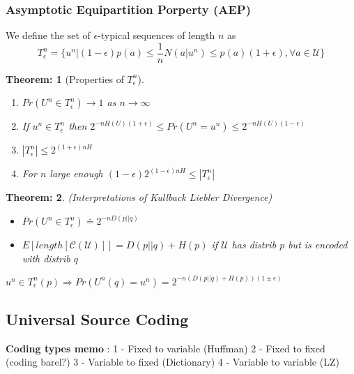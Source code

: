 \documentclass[11pt, a4paper]{scrartcl}
\newtheorem{theorem}{Theorem:}[section]
\newenvironment{definition}[1][Definition]{\begin{trivlist}
\item[\hskip \labelsep {\bfseries #1}]}{\end{trivlist}}
\newenvironment{remark}[1][Remark]{\begin{trivlist}
\item[\hskip \labelsep {\bfseries #1}]}{\end{trivlist}}
\begin{document}
\subsubsection{Asymptotic Equipartition Porperty (AEP)}

\begin{definition}
  We define the set of $\epsilon$-typical sequences of length $n$ as
$$T_\epsilon^n=\{u^n |
 (1-\epsilon)p(a)\leq \frac{1}{n}N(a|u^n)\leq p(a)(1+\epsilon), \forall a\in \mathcal{U}\}$$
\end{definition}

\begin{theorem} [Properties of $T_\epsilon^n$]

  \begin{enumerate}
    \item $ Pr(U^n\in T_\epsilon^n)\rightarrow 1$ as $n\rightarrow
      \infty$
    \item If $u^n\in  T_\epsilon^n$ then $2^{-nH(U)(1+\epsilon)}\leq 
      Pr(U^n=u^n)\leq 2^{-nH(U)(1-\epsilon)}$
    \item $ |T_\epsilon^n|\leq2^{(1+\epsilon)nH}$
    \item For $n$ large enough $(1-\epsilon)2^{(1-\epsilon)nH}\leq |T_\epsilon^n|$
  \end{enumerate}
\end{theorem}

\begin{theorem} (Interpretations of Kullback Liebler Divergence)
\begin{itemize}
\item $Pr(U^n\in T_\epsilon^n) \doteq 2^{-nD(p||q)}$
\item $ E[length[\mathcal C(\mathcal U) ]] = D(p||q) +H(p)$ if $\mathcal U$ has distrib $p$ but is encoded with distrib $q$
\end{itemize}
\end{theorem}

\begin{remark} $u^n \in T_{\epsilon}^n(p) \Rightarrow
       Pr(U^n(q) = u^n) = 2^{-n(D(p||q) + H(p))(1 \pm \epsilon)}$
\end{remark}

\subsection{Universal Source Coding}
\textbf{Coding types memo} : 1 - Fixed to variable (Huffman) 2 - Fixed to fixed (coding barel?) 3 - Variable to fixed (Dictionary) 4 - Variable to variable (LZ)
\end{document}
